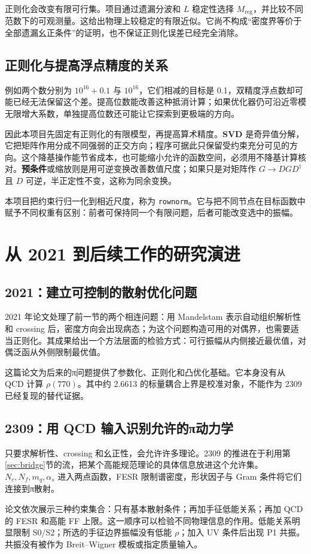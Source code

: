 \documentclass[UTF8,a4paper,11pt,fontset=fandol]{ctexart}
\numberwithin{equation}{section}
\newcommand{\Mreg}{M_{\mathrm{reg}}}
\newcommand{\code}[1]{{\urlstyle{tt}\nolinkurl{#1}}}
\newcommand{\newchapter}[1]{\FloatBarrier\Needspace{9\baselineskip}\section{#1}}
\begin{document}
正则化会改变有限可行集。项目通过遗漏分波和 \(L\) 稳定性选择 \(\Mreg\)，并比较不同范数下的可观测量。这给出物理上较稳定的有限近似。它尚不构成“密度界等价于全部遗漏幺正条件”的证明，也不保证正则化误差已经完全消除。

\subsection{正则化与提高浮点精度的关系}
例如两个数分别为 \(10^{16}+0.1\) 与 \(10^{16}\)，它们相减的目标是 0.1，双精度浮点数却可能已经无法保留这个差。提高位数能改善这种抵消计算；如果优化器仍可沿近零模无限增大系数，单独提高位数还可能让它探索到更极端的方向。

因此本项目先固定有正则化的有限模型，再提高算术精度。\textbf{SVD} 是奇异值分解，它把矩阵作用分成不同强弱的正交方向；程序可据此只保留受约束充分可见的方向。这个降基操作能节省成本，也可能缩小允许的函数空间，必须用不降基计算核对。\textbf{预条件}或缩放则是用可逆变换改善数值尺度；如果只是对矩阵作 \(G\to DGD^\dagger\) 且 \(D\) 可逆，半正定性不变，这称为同余变换。

本项目把约束行归一化到相近尺度，称为 \code{rownorm}。它与把不同节点在目标函数中赋予不同权重有区别：前者可保持同一个有限问题，后者可能改变选中的振幅。
\newchapter{从 2021 到后续工作的研究演进}\label{sec:series}
\subsection{2021：建立可控制的散射优化问题}
2021 年论文\cite{hk21}处理了前一节的两个相连问题：用 Mandelstam 表示自动组织解析性和 crossing 后，密度方向会出现病态；为这个问题构造可用的对偶界，也需要适当正则化。其成果给出一个方法层面的检验方式：可行振幅从内侧接近最优值，对偶泛函从外侧限制最优值。

这篇论文为后来的π问题提供了参数化、正则化和凸优化基础。它本身没有从 QCD 计算 \(\rho(770)\)。其中约 2.6613 的标量耦合上界是校准对象，不能作为 2309 已经复现的替代证据。

\subsection{2309：用 QCD 输入识别允许的π动力学}
只要求解析性、crossing 和幺正性，会允许许多理论。2309 的推进在于利用第\ref{sec:bridge}节的流，把某个高能规范理论的具体信息放进这个允许集。\(N_c,N_f,m_q,\alpha_s\) 进入两点函数，FESR 限制谱密度，形状因子与 Gram 条件将它们连接到π散射。\cite{hk23}

论文依次展示三种约束集合：只有基本散射条件；再加手征低能关系；再加 QCD 的 FESR 和高能 FF 上限。这一顺序可以检验不同物理信息的作用。低能关系明显限制 S0/S2；所选的手征边界振幅没有低能 \(\rho\)；加入 UV 条件后出现 P1 共振。共振没有被作为 Breit--Wigner 模板或指定质量输入。
\end{document}
